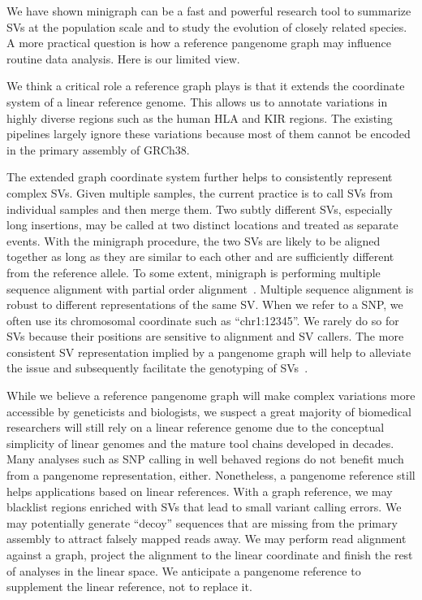 \documentclass[twocolumn]{bmcart}%
\begin{document}
We have shown minigraph can be a fast and powerful research tool to summarize
SVs at the population scale and to study the evolution of closely related
species. A more practical question is how a reference pangenome graph may
influence routine data analysis. Here is our limited view.

We think a critical role a reference graph plays is that it extends the
coordinate system of a linear reference genome. This allows us to annotate
variations in highly diverse regions such as the human HLA and KIR regions. The
existing pipelines largely ignore these variations because most of them cannot
be encoded in the primary assembly of GRCh38.

The extended graph coordinate system further helps to consistently represent
complex SVs. Given multiple samples, the current practice is to call SVs from
individual samples and then merge them. Two subtly different SVs, especially
long insertions, may be called at two distinct locations and treated as
separate events. With the minigraph procedure, the two SVs are likely to
be aligned together as long as they are similar to each other and are
sufficiently different from the reference allele. To some extent, minigraph is
performing multiple sequence alignment with partial order
alignment~\cite{Lee_2002}. Multiple sequence alignment is robust to different
representations of the same SV. When we refer to a SNP, we often use its
chromosomal coordinate such as ``chr1:12345''. We rarely do so for SVs because
their positions are sensitive to alignment and SV callers. The more consistent
SV representation implied by a pangenome graph will help to alleviate the issue
and subsequently facilitate the genotyping of
SVs~\cite{Hickey_2020,Eggertsson_2019,Chen_2019}.

While we believe a reference pangenome graph will make complex variations more
accessible by geneticists and biologists, we suspect a great majority of
biomedical researchers will still rely on a linear reference genome due to the
conceptual simplicity of linear genomes and the mature tool chains developed in
decades. Many analyses such as SNP calling in well behaved regions do not
benefit much from a pangenome representation, either. Nonetheless, a pangenome
reference still helps applications based on linear references. With a graph
reference, we may blacklist regions enriched with SVs that lead to small variant
calling errors.  We may potentially generate ``decoy'' sequences that are
missing from the primary assembly to attract falsely mapped reads away. We may
perform read alignment against a graph, project the alignment to the linear
coordinate and finish the rest of analyses in the linear space. We anticipate a
pangenome reference to supplement the linear reference, not to replace it.
\end{document}
